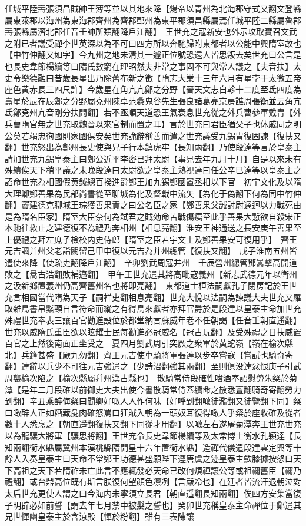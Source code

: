任城平陸壽張須昌賊帥王薄等並以其地來降【煬帝以青州為北海郡守式又翻文登縣屬東萊郡以海州為東海郡齊州為齊郡鄆州為東平郡須昌縣屬焉任城平陸二縣屬魯郡壽張縣屬濟北郡任音壬帥所類翻降戶江翻】　王世充之寇新安也外示攻取實召文武之附已者議受禪李世英深以為不可曰四方所以奔馳歸附東都者以公能中興隋室故也【中竹仲翻又如字】今九州之地未清其一遽正位號恐遠人皆思叛去矣世充曰公言是也長史韋節楊續等曰隋氏數窮在理昭然夫非常之事固不可與常人議之【夫音扶】太史令樂德融曰昔歲長星出乃除舊布新之徵【隋志大業十三年六月有星孛于太微五帝座色黄赤長三四尺許】今歲星在角亢亢鄭之分野【晉天文志自軫十二度至氐四度為壽星於辰在辰鄭之分野屬兗州陳卓范蠡鬼谷先生張良諸葛亮京房譙周張衡並云角亢氐鄭兗州亢音剛分扶問翻】若不亟順天道恐王氣衰息世充從之外兵曹參軍戴胄【外兵曹隋官無之世充取魏晉以來官制而置之耳】言於世充曰君臣猶父子也休戚同之明公莫若竭忠徇國則家國俱安矣世充詭辭稱善而遣之世充議受九錫胄復固諫【復扶又翻】世充怒出為鄭州長史使與兄子行本鎮虎牢【長知兩翻】乃使段達等言於皇泰主請加世充九錫皇泰主曰鄭公近平李密已拜太尉【事見去年九月十月】自是以來未有殊績俟天下稍平議之未晚段達曰太尉欲之皇泰主熟視達曰任公辛巳達等以皇泰主之詔命世充為相國假黄鉞總百揆進爵鄭王加九錫鄭國置丞相以下官　初宇文化及以隋大理卿鄭善果為民部尚書從至聊城為化及督戰中流矢【為化于偽翻下何為同中竹仲翻】竇建德克聊城王琮獲善果責之曰公名臣之家【鄭善果父誠討尉遟迴以力戰死由是為隋名臣家】隋室大臣奈何為弑君之賊効命苦戰傷痍至此乎善果大慙欲自殺宋正本馳往救止之建德復不為禮乃奔相州【相息亮翻】淮安王神通送之長安庚午善果至上優禮之拜左庶子檢校内史侍郎【隋室之臣若宇文士及鄭善果安可復用乎】　齊王元吉諷并州父老詣闕留己甲申復以元吉為并州總管【復扶又翻】　戊子淮南五州皆遣使來降【使疏吏翻降戶江翻】　辛卯劉武周寇并州　壬辰營州總管鄧暠擊高開道敗之【暠古浩翻敗補邁翻】　甲午王世充遣其將高毗寇義州【新志武德元年以衛州之汲新鄉置義州仍高齊舊州名也將即亮翻】　東都道士桓法嗣獻孔子閉房記於王世充言相國當代隋為天子【嗣祥吏翻相息亮翻】世充大悅以法嗣為諫議大夫世充又羅取雜鳥書帛繫頸自言符命而縱之有得鳥來獻者亦拜官爵於是段達以皇泰主命加世充殊禮世充奉表三讓百官勸進設位於都堂納言蘇威年老不任朝謁【任音壬朝直遥翻】世充以威隋氏重臣欲以眩耀士民每勸進必冠威名【冠古玩翻】及受殊禮之日扶威置百官之上然後南面正坐受之　夏四月劉武周引突厥之衆軍於黄蛇嶺【嶺在榆次縣北】兵鋒甚盛【厥九勿翻】齊王元吉使車騎將軍張達以步卒嘗寇【嘗試也騎奇寄翻】達辭以兵少不可往元吉強遣之【少詩沼翻強其兩翻】至則俱没達忿恨庚子引武周襲榆次陷之【榆次縣屬幷州漢古縣也】　散騎常侍段確性嗜酒奉詔慰勞朱粲於菊潭【是年二月段確以前御史大夫出使今書散騎常侍蓋續命之散悉亶翻騎奇寄翻勞力到翻】辛丑乘醉侮粲曰聞卿好噉人人作何味【好呼到翻噉徒濫翻又徒覽翻下同】粲曰噉醉人正如糟藏彘肉確怒罵曰狂賊入朝為一頭奴耳復得噉人乎粲於座收確及從者數十人悉烹之【朝直遥翻復扶又翻下同從才用翻】以噉左右遂屠菊潭奔王世充世充以為龍驤大將軍【驤思將翻】王世充令長史韋節楊續等及太常博士衡水孔穎達【長知兩翻衡水縣屬冀州本漢桃縣隋開皇十六年置衡水縣】造禪代儀遣段達雲定興等十餘人入奏皇泰主曰天命不常鄭王功德甚盛願陛下遵唐虞之迹皇泰主歛膝據按怒曰天下高祖之天下若隋祚未亡此言不應輒發必天命已改何煩禪讓公等或祖禰舊臣【禰乃禮翻】或台鼎高位既有斯言朕復何望顔色凛冽【言嚴冷也】在廷者皆流汗退朝泣對太后世充更使人謂之曰今海内未寧須立長君【朝直遥翻長知兩翻】俟四方安集當復子明辟必如前誓【謂去年七月禁中被髮之誓也】癸卯世充稱皇泰主命禪位于鄭遣其兄世惲幽皇泰主於含涼殿【惲於粉翻】雖有三表陳讓